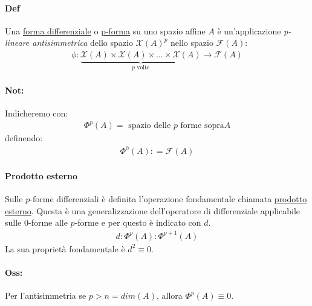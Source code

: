 \documentclass[10pt,a4paper]{book}
\begin{document}
\paragraph{Def} Una \underline{forma differenziale} o \underline{p-forma} su uno spazio affine $A$ è un'applicazione \textit{p-lineare antisimmetrica} dello spazio $\mathcal{X}(A)^p$ nello spazio $\mathcal{F}(A)$:
\begin{align*}
    \phi \colon \underbrace{\mathcal{X}(A)\times \mathcal{X}(A)\times \dots \times \mathcal{X}(A)}_{p \text{ volte}}\to \mathcal{F}(A)
\end{align*}
\paragraph{Not:}Indicheremo con:
\begin{align*}
    \Phi^p(A)=\text{ spazio delle $p$ forme sopra} A
\end{align*}
definendo:
\begin{align*}
    \Phi^0(A)\colon =\mathcal{F}(A)
\end{align*}
\paragraph{Prodotto esterno} Sulle $p$-forme differenziali è definita l'operazione fondamentale chiamata \underline{prodotto esterno}.
Questa è una generalizzazione dell'operatore di differenziale applicabile sulle $0$-forme alle $p$-forme e per questo è indicato con $d$.
\begin{align*}
    d\colon \Phi^p(A)\colon \Phi ^{p+1}(A)
\end{align*}
La sua proprietà fondamentale è $d^2\equiv 0$.
\paragraph{Oss:} Per l'antisimmetria se $p>n=dim(A)$, allora $\Phi^p(A)\equiv 0$.
\end{document}
